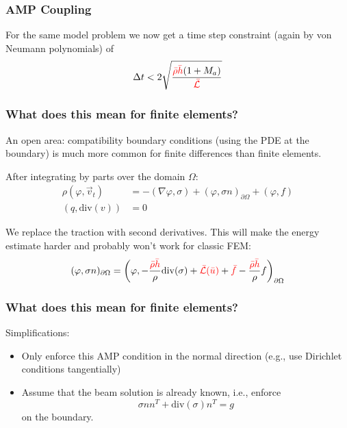 \documentclass[8pt]{beamer}
\newcommand{\leftd}[1]{{\color{red} \bar{#1}}}
\newcommand{\leftdd}[2]{{\color{red} \bar{#1}(\bar{#2})}}
\newcommand{\divergence}{\mathrm{div}}
\begin{document}
\begin{frame}
    \frametitle{AMP Coupling}
    For the same model problem we now get a time step constraint (again by von
    Neumann polynomials) of
    \begin{equation}
        \Delta t < 2
        \sqrt{\dfrac{\leftd{\rho} \leftd{h} (1 + M_a)}{\leftd{\mathcal{L}}}}
    \end{equation}
\end{frame}

\begin{frame}
    \frametitle{What does this mean for finite elements?}
    An open area: compatibility boundary conditions (using the PDE at the
    boundary) is much more common for finite differences than finite elements.

    \pause
    \vspace{0.5in}
    After integrating by parts over the domain \(\Omega\):
    \begin{align}
        \rho (\varphi, \vec{v}_t) &= -(\nabla \varphi, \sigma)
        + (\varphi, \sigma n)_{\partial \Omega}
        + (\varphi, f)                                                        \\
        (q, \divergence(v)) &= 0
    \end{align}

    We replace the traction with second derivatives. This will make the
    energy estimate harder and probably won't work for classic FEM:
    \begin{equation}
        (\varphi, \sigma n)_{\partial \Omega} = \left(\varphi,
        - \dfrac{\leftd{\rho} \leftd{h}}{\rho} \divergence(\sigma)
        + \leftdd{\mathcal{L}}{u}
        + \leftd{f}
        - \dfrac{\leftd{\rho} \leftd{h}}{\rho} f\right)_{\partial \Omega}
    \end{equation}
\end{frame}

\begin{frame}
    \frametitle{What does this mean for finite elements?}
    Simplifications:
    \begin{itemize}
        \item Only enforce this AMP condition in the normal direction (e.g., use
              Dirichlet conditions tangentially)
        \item Assume that the beam solution is already known, i.e., enforce
              \begin{equation}
                  \sigma n n^T + \divergence(\sigma) n^T = g
              \end{equation}
              on the boundary.
    \end{itemize}
\end{frame}
\end{document}

